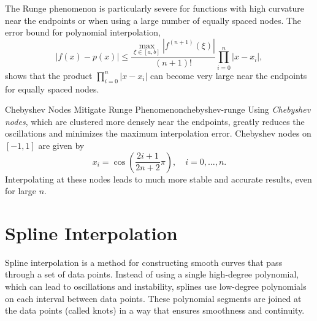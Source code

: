 The Runge phenomenon is particularly severe for functions with high curvature near the endpoints or when using a large number of equally spaced nodes. The error bound for polynomial interpolation,
\[
    |f(x) - p(x)| \leq \frac{\max_{\xi \in [a,b]} |f^{(n+1)}(\xi)|}{(n+1)!} \prod_{i=0}^n |x - x_i|,
\]
shows that the product \(\prod_{i=0}^n |x - x_i|\) can become very large near the endpoints for equally spaced nodes.

\begin{remark}{Chebyshev Nodes Mitigate Runge Phenomenon}{chebyshev-runge}
    Using \emph{Chebyshev nodes}, which are clustered more densely near the endpoints, greatly reduces the oscillations and minimizes the maximum interpolation error. Chebyshev nodes on \([-1,1]\) are given by
    \[
        x_i = \cos\left(\frac{2i+1}{2n+2}\pi\right), \quad i = 0, \ldots, n.
    \]
    Interpolating at these nodes leads to much more stable and accurate results, even for large \(n\).
\end{remark}

\section{Spline Interpolation}
Spline interpolation is a method for constructing smooth curves that pass through a set of data points. Instead of using a single high-degree polynomial, which can lead to oscillations and instability, splines use low-degree polynomials on each interval between data points. These polynomial segments are joined at the data points (called knots) in a way that ensures smoothness and continuity.

